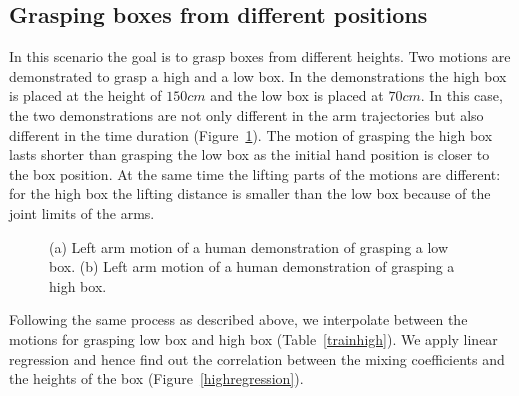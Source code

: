 \subsection{Grasping boxes from different positions}
\label{sbsec:diffheight}
In this scenario the goal is to grasp boxes from different heights. Two motions are demonstrated to grasp a high and a low box. In the demonstrations the high box is placed at the height of $150 cm$ and the low box is placed at $70 cm$. In this case, the two demonstrations are not only different in the arm trajectories but also different in the time duration (Figure~\ref{highlowjoint}). The motion of grasping the high box lasts shorter than grasping the low box as the initial hand position is closer to the box position. At the same time the lifting parts of the motions are different: for the high box the lifting distance is smaller than the low box because of the joint limits of the arms.

\begin{figure}
    \centering
    \caption{ \scriptsize{(a) Left arm motion of a human demonstration of grasping a low box. (b) Left arm motion of a human demonstration of grasping a high box.}}
\label{highlowjoint}
\end{figure}
Following the same process as described above, we interpolate between the motions for grasping low box and high box (Table~\ref{trainhigh}). We apply linear regression and hence find out the correlation between the mixing coefficients and the heights of the box (Figure~\ref{highregression}).

